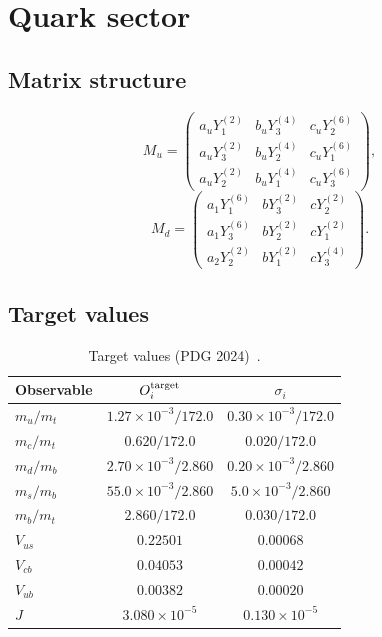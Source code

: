 \documentclass[12pt,a4paper]{article}
\numberwithin{equation}{section}
\begin{document}
\section{Quark sector}
\subsection{Matrix structure}
\begin{equation}
M_u = \begin{pmatrix}
a_u Y_1^{(2)} & b_u Y_3^{(4)} & c_u Y_2^{(6)} \\
a_u Y_3^{(2)} & b_u Y_2^{(4)} & c_u Y_1^{(6)} \\
a_u Y_2^{(2)} & b_u Y_1^{(4)} & c_u Y_3^{(6)}
\end{pmatrix},
\end{equation}
\begin{equation}
M_d = \begin{pmatrix}
a_1 Y_1^{(6)} & b Y_3^{(2)} & c Y_2^{(2)} \\
a_1 Y_3^{(6)} & b Y_2^{(2)} & c Y_1^{(2)} \\
a_2 Y_2^{(2)} & b Y_1^{(2)} & c Y_3^{(4)}
\end{pmatrix}.
\end{equation}

\subsection{Target values}
\begin{table}[H]
\centering
\caption{Target values (PDG 2024)~\cite{PDG2024}.}
\begin{tabular}{lcc}
\toprule
Observable & \(O_i^{\rm target}\) & \(\sigma_i\) \\
\midrule
\(m_u/m_t\) & \(1.27\times 10^{-3}/172.0\) & \(0.30\times 10^{-3}/172.0\) \\
\(m_c/m_t\) & \(0.620/172.0\) & \(0.020/172.0\) \\
\(m_d/m_b\) & \(2.70\times 10^{-3}/2.860\) & \(0.20\times 10^{-3}/2.860\) \\
\(m_s/m_b\) & \(55.0\times 10^{-3}/2.860\) & \(5.0\times 10^{-3}/2.860\) \\
\(m_b/m_t\) & \(2.860/172.0\) & \(0.030/172.0\) \\
\(V_{us}\) & \(0.22501\) & \(0.00068\) \\
\(V_{cb}\) & \(0.04053\) & \(0.00042\) \\
\(V_{ub}\) & \(0.00382\) & \(0.00020\) \\
\(J\) & \(3.080\times 10^{-5}\) & \(0.130\times 10^{-5}\) \\
\bottomrule
\end{tabular}
\end{table}
\end{document}
